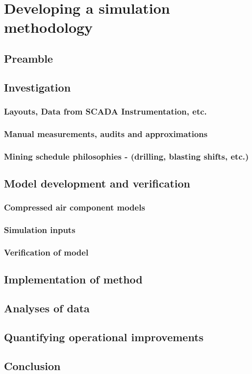 \chapter{Developing a simulation methodology}
\section{Preamble}
\section{Investigation}
	\subsection{Layouts, Data from SCADA Instrumentation, etc.}
	\subsection{Manual measurements, audits and approximations}
	\subsection{Mining schedule philosophies \color{blue} - (drilling, blasting shifts, etc.)}
\section{Model development and verification}
	\subsection{Compressed air component models}
	\subsection{Simulation inputs}
	\subsection{Verification of model}
\section{Implementation of method}
\section{Analyses of data}
\section{Quantifying operational improvements}
\section{Conclusion}